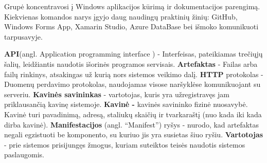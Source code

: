 \documentclass{VUMIFPSkursinis}
\begin{document}
Grupė koncentravosi į Windows aplikacijos kūrimą ir dokumentacijos parengimą. Kiekvienas komandos narys įgyjo daug naudingų praktinių žinių: GitHub, Windows Forms App, Xamarin Studio, Azure DataBase bei išmoko komunikuoti tarpusavyje.

\noindent
\textbf{API}(angl. Application programming interface ) - Interfeisas, pateikiamas trečiųjų šalių, leidžiantis naudotis išorinės programos servisais.
\newline
\textbf{Artefaktas} - Failas arba failų rinkinys, atsakingas už kurią nors sistemos veikimo dalį. 
\newline
\textbf{HTTP} protokolas - Duomenų perdavimo protokolas, naudojamas visose naršyklėse komunikuojant su serveriu.
\newline
\textbf{Kavinės savininkas} - vartotojas, kuris yra užregistravęs jam priklausančią kavinę sistemoje.
\newline
\textbf{Kavinė -} kavinės savininko fizinė nuosavybė. Kavinė turi pavadinimą, adresą, staliukų skaičių ir tvarkaraštį (nuo kada iki kada dirba kavinė).
\newline
\textbf{Manifestacijos} (angl. “Manifest”) ryšys - nurodo, kad artefaktas negali egzistuoti be komponento, su kuriuo jis yra susietas šiuo ryšiu.
\newline
\textbf{Vartotojas} - prie sistemos prisijungęs žmogus, kuriam suteiktos teisės naudotis sistemos paslaugomis.
\newline
\end{document}
